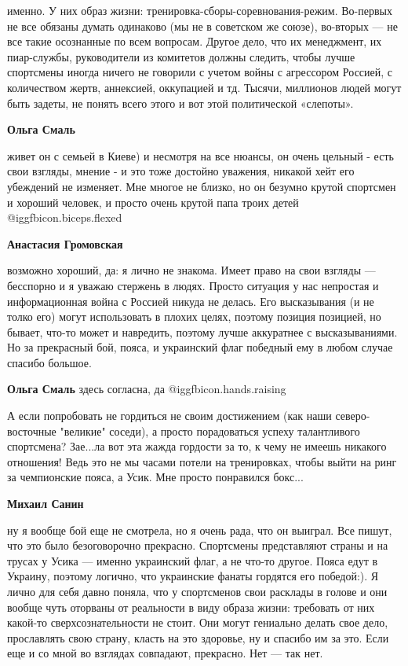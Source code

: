\begin{itemize}
\begin{itemize}
именно. У них образ жизни: тренировка-сборы-соревнования-режим. Во-первых не
все обязаны думать одинаково (мы не в советском же союзе), во-вторых — не все
такие осознанные по всем вопросам. Другое дело, что их менеджмент, их
пиар-службы, руководители из комитетов должны следить, чтобы лучше спортсмены
иногда ничего не говорили с учетом войны с агрессором Россией, с количеством
жертв, аннексией, оккупацией и тд. Тысячи, миллионов людей могут быть задеты,
не понять всего этого и вот этой политической «слепоты».

\textbf{Ольга Смаль} 

живет он с семьей в Киеве) и несмотря на все нюансы, он очень цельный - есть
свои взгляды, мнение - и это тоже достойно уважения, никакой хейт его убеждений
не изменяет. Мне многое не близко, но он безумно крутой спортсмен и хороший
человек, и просто очень крутой папа троих детей @igg{fbicon.biceps.flexed} 


\textbf{Анастасия Громовская} 

возможно хороший, да: я лично не знакома. Имеет право на свои взгляды —
бесспорно и я уважаю стержень в людях. Просто ситуация у нас непростая и
информационная война с Россией никуда не делась. Его высказывания (и не толко
его) могут использовать в плохих целях, поэтому позиция позицией, но бывает,
что-то может и навредить, поэтому лучше аккуратнее с высказываниями. Но за
прекрасный бой, пояса, и украинский флаг победный ему в любом случае спасибо
большое.

\textbf{Ольга Смаль} здесь согласна, да @igg{fbicon.hands.raising} 

\end{itemize} %


А если попробовать не гордиться не своим достижением (как наши северо-восточные
"великие" соседи), а просто порадоваться успеху талантливого спортсмена?
Зае...ла вот эта жажда гордости за то, к чему не имеешь никакого отношения!
Ведь это не мы часами потели на тренировках, чтобы выйти на ринг за чемпионские
пояса, а Усик. Мне просто понравился бокс...

\begin{itemize} %
\textbf{Михаил Санин} 

ну я вообще бой еще не смотрела, но я очень рада, что он выиграл. Все пишут,
что это было безоговорочно прекрасно. Спортсмены представляют страны и на
трусах у Усика — именно украинский флаг, а не что-то другое. Пояса едут в
Украину, поэтому логично, что украинские фанаты гордятся его победой:). Я лично
для себя давно поняла, что у спортсменов свои расклады в голове и они вообще
чуть оторваны от реальности в виду образа жизни: требовать от них какой-то
сверхсознательности не стоит. Они могут гениально делать свое дело, прославлять
свою страну, класть на это здоровье, ну и спасибо им за это. Если еще и со мной
во взглядах совпадают, прекрасно. Нет — так нет.


\end{itemize}
\end{itemize}
